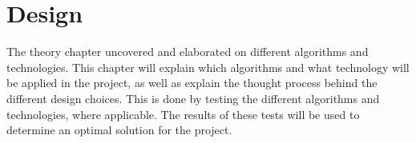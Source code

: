 \chapter{Design}
The theory chapter uncovered and elaborated on different algorithms and technologies.
This chapter will explain which algorithms and what technology will be applied in the project, as well as explain the thought process behind the different design choices.
This is done by testing the different algorithms and technologies, where applicable.
The results of these tests will be used to determine an optimal solution for the project.











